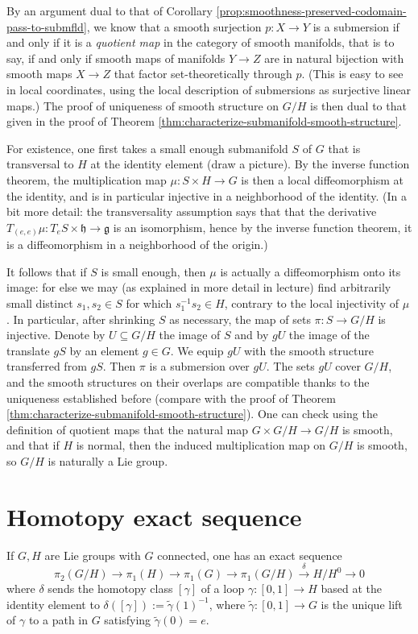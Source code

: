 \documentclass[reqno]{amsart} 
\begin{document}
By an argument dual to that of Corollary \eqref{prop:smoothness-preserved-codomain-pass-to-submfld}, we know that a smooth surjection $p : X \rightarrow Y$ is a submersion if and only if it is a \emph{quotient map} in the category of smooth manifolds, that is to say, if and only if smooth maps of manifolds $Y \rightarrow Z$ are in natural bijection with smooth maps $X \rightarrow Z$ that factor set-theoretically through $p$.  (This is easy to see in local coordinates, using the local description of submersions as surjective linear maps.)  The proof of uniqueness of smooth structure on $G/H$ is then dual to that given in the proof of Theorem \ref{thm:characterize-submanifold-smooth-structure}.

For existence, one first takes a small enough submanifold $S$ of $G$ that is transversal to $H$ at the identity element (draw a picture).  By the inverse function theorem, the multiplication map $\mu : S \times H \rightarrow G$ is then a local diffeomorphism at the identity, and is in particular injective in a neighborhood of the identity.  (In a bit more detail: the transversality assumption says that that the derivative $T_{(e,e)} \mu : T_e S \times \mathfrak{h} \rightarrow \mathfrak{g}$ is an isomorphism, hence by the inverse function theorem, it is a diffeomorphism in a neighborhood of the origin.)

It follows that if $S$ is small enough, then $\mu$ is actually a diffeomorphism onto its image: for else we may (as explained in more detail in lecture) find arbitrarily small distinct $s_1,s_2 \in S$ for which $s_1^{-1} s_2 \in H$, contrary to the local injectivity of $\mu$.  In particular, after shrinking $S$ as necessary, the map of sets $\pi : S \rightarrow G/H$ is injective.  Denote by $U \subseteq G/H$ the image of $S$ and by $g U$ the image of the translate $g S$ by an element $g \in G$.  We equip $g U$ with the smooth structure transferred from $g S$.  Then $\pi$ is a submersion over $g U$.  The sets $g U$ cover $G/H$, and the smooth structures on their overlaps are compatible thanks to the uniqueness established before (compare with the proof of Theorem \ref{thm:characterize-submanifold-smooth-structure}).  One can check using the definition of quotient maps that the natural map $G \times G/H \rightarrow G/H$ is smooth, and that if $H$ is normal, then the induced multiplication map on $G/H$ is smooth, so $G/H$ is naturally a Lie group.

\section{Homotopy exact sequence}
\label{sec:org245e5dc}
If $G,H$ are Lie groups with $G$ connected, one has an exact sequence
\begin{equation*}
  \pi_2(G/H) \rightarrow \pi_1(H) \rightarrow \pi_1(G) \rightarrow \pi_1(G/H) \xrightarrow{\delta} H/H^0 \rightarrow 0
\end{equation*}
where $\delta$ sends the homotopy class $[\gamma]$ of a loop $\gamma : [0,1] \rightarrow H$ based at the identity element to $\delta([\gamma]) := \tilde{\gamma}(1)^{-1}$, where $\tilde{\gamma} : [0,1] \rightarrow G$ is the unique lift of $\gamma$ to a path in $G$ satisfying $\tilde{\gamma}(0) = e$.
\end{document}
